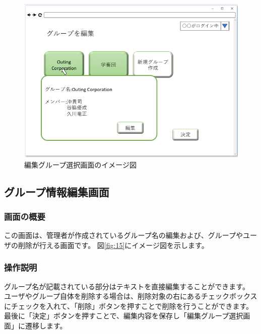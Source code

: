\begin{figure}[htbp]
  \begin{center}
    \includegraphics[width=1\linewidth,clip]{./img/14.png}
    \caption{編集グループ選択画面のイメージ図}\label{fig:14}
  \end{center}
\end{figure}

\newpage

\subsection{グループ情報編集画面}
\subsubsection{画面の概要}
この画面は、管理者が作成されているグループ名の編集および、グループやユーザの削除が行える画面です。
図\ref{fig:15}にイメージ図を示します。

\subsubsection{操作説明}
グループ名が記載されている部分はテキストを直接編集することができます。
ユーザやグループ自体を削除する場合は、削除対象の右にあるチェックボックスにチェックを入れて、「削除」ボタンを押すことで削除を行うことができます。
最後に「決定」ボタンを押すことで、編集内容を保存し「編集グループ選択画面」に遷移します。

